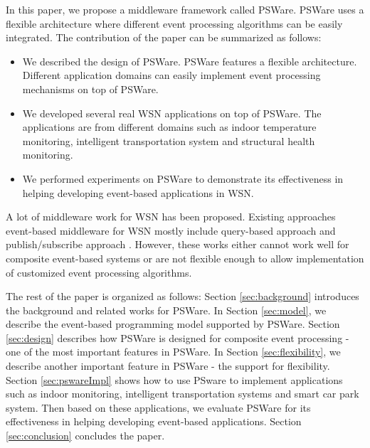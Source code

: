 In this paper, we propose a middleware framework called PSWare. PSWare uses a flexible architecture where different event processing algorithms can be easily integrated. The contribution of the paper can be summarized as follows:
\begin{itemize}
\item We described the design of PSWare. PSWare features a flexible architecture. Different application domains can easily implement event processing mechanisms on top of PSWare.
\item We developed several real WSN applications on top of PSWare. The applications are from different domains such as indoor temperature monitoring, intelligent transportation system and structural health monitoring.
\item We performed experiments on PSWare to demonstrate its effectiveness in helping developing event-based applications in WSN.
\end{itemize}

A lot of middleware work for WSN has been proposed. Existing approaches event-based middleware for WSN mostly include query-based approach \cite{tinydb} and publish/subscribe approach \cite{complexevent}. However, these works either cannot work well for composite event-based systems or are not flexible enough to allow implementation of customized event processing algorithms. 



The rest of the paper is organized as follows: Section \ref{sec:background} introduces the background and related works for PSWare. In Section \ref{sec:model}, we describe the event-based programming model supported by PSWare. Section \ref{sec:design} describes how PSWare is designed for composite event processing - one of the most important features in PSWare. In Section \ref{sec:flexibility}, we describe another important feature in PSWare - the support for flexibility. Section \ref{sec:pswareImpl} shows how to use PSware to implement applications such as indoor monitoring, intelligent transportation systems and smart car park system. Then based on these applications, we evaluate PSWare for its effectiveness in helping developing event-based applications. Section \ref{sec:conclusion} concludes the paper.